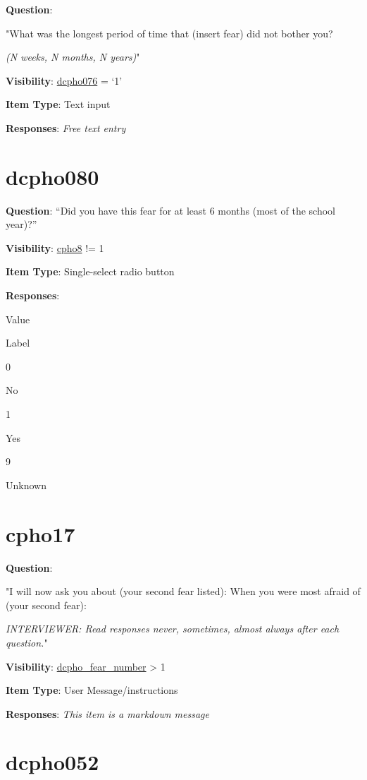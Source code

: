 \documentclass[]{book}
\begin{document}
\textbf{Question}:

"What was the longest period of time that (insert fear) did not bother you?

\emph{(N weeks, N months, N years)}"

\textbf{Visibility}: \protect\hyperlink{dcpho076}{dcpho076} = `1'

\textbf{Item Type}: Text input

\textbf{Responses}: \emph{Free text entry}

\hypertarget{dcpho080}{%
\section{dcpho080}\label{dcpho080}}

\textbf{Question}: ``Did you have this fear for at least 6 months (most of the school year)?''

\textbf{Visibility}: \protect\hyperlink{cpho8}{cpho8} != 1

\textbf{Item Type}: Single-select radio button

\textbf{Responses}:

Value

Label

0

No

1

Yes

9

Unknown

\hypertarget{cpho17}{%
\section{cpho17}\label{cpho17}}

\textbf{Question}:

"I will now ask you about (your second fear listed): When you were most afraid of (your second fear):

\emph{INTERVIEWER: Read responses never, sometimes, almost always after each question.}"

\textbf{Visibility}: \protect\hyperlink{dcpho_fear_number}{dcpho\_fear\_number} \textgreater{} 1

\textbf{Item Type}: User Message/instructions

\textbf{Responses}: \emph{This item is a markdown message}

\hypertarget{dcpho052}{%
\section{dcpho052}\label{dcpho052}}
\end{document}
